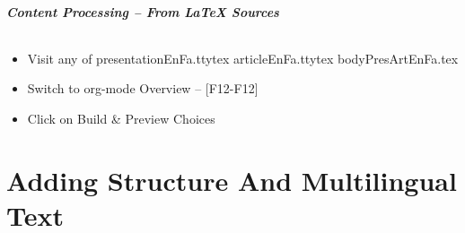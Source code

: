 \begin{comment}
*****  [[elisp:(org-cycle)][| ]]  [[elisp:(blee:ppmm:org-mode-toggle)][Nat]] [[elisp:(beginning-of-buffer)][Top]] [[elisp:(delete-other-windows)][(1)]] || /Frame/ *Label=ContentProcessing--FromLaTeXSources*  Content Processing -- From LaTeX Sources ::  [[elisp:(org-cycle)][| ]]
\end{comment}

\begin{frame}[fragile,label=ContentProcessing--FromLaTeXSources]
    \frametitle{Content Processing -- From LaTeX Sources}
    \framesubtitle{}

    \begin{itemize}
    \item Visit any of presentationEnFa.ttytex articleEnFa.ttytex bodyPresArtEnFa.tex
    \item Switch to org-mode Overview -- [F12-F12]
    \item Click on Build \& Preview Choices
    \end{itemize}

\end{frame}


\begin{comment}
*      ================
*  [[elisp:(org-cycle)][| ]] [[elisp:(org-show-subtree)][|=]] [[elisp:(show-children 10)][|V]] [[elisp:(bx:orgm:indirectBufOther)][|>]] [[elisp:(bx:orgm:indirectBufMain)][|I]] [[elisp:(blee:ppmm:org-mode-toggle)][|N]] [[elisp:(org-top-overview)][|O]] [[elisp:(progn (org-shifttab) (org-content))][|C]] [[elisp:(delete-other-windows)][|1]]  *Part 0*   /Adding Structure And Multilingual Text/ ::  [[elisp:(org-cycle)][| ]]
\end{comment}

\newpage
\part{Adding Structure And Multilingual Text}
\label{part:AddingStructureAndMultilingualText}


